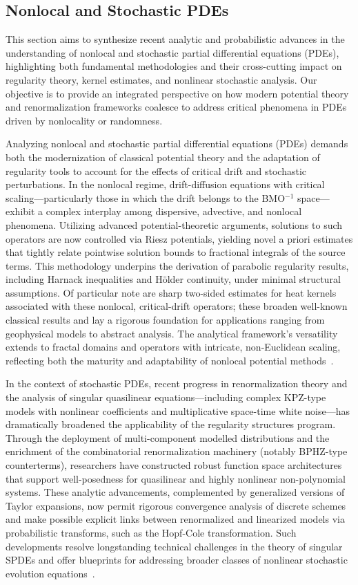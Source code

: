 \documentclass[sigconf]{acmart}
\begin{document}
\subsection{Nonlocal and Stochastic PDEs}

This section aims to synthesize recent analytic and probabilistic advances in the understanding of nonlocal and stochastic partial differential equations (PDEs), highlighting both fundamental methodologies and their cross-cutting impact on regularity theory, kernel estimates, and nonlinear stochastic analysis. Our objective is to provide an integrated perspective on how modern potential theory and renormalization frameworks coalesce to address critical phenomena in PDEs driven by nonlocality or randomness.

Analyzing nonlocal and stochastic partial differential equations (PDEs) demands both the modernization of classical potential theory and the adaptation of regularity tools to account for the effects of critical drift and stochastic perturbations. In the nonlocal regime, drift-diffusion equations with critical scaling—particularly those in which the drift belongs to the BMO$^{-1}$ space—exhibit a complex interplay among dispersive, advective, and nonlocal phenomena. Utilizing advanced potential-theoretic arguments, solutions to such operators are now controlled via Riesz potentials, yielding novel a priori estimates that tightly relate pointwise solution bounds to fractional integrals of the source terms. This methodology underpins the derivation of parabolic regularity results, including Harnack inequalities and Hölder continuity, under minimal structural assumptions. Of particular note are sharp two-sided estimates for heat kernels associated with these nonlocal, critical-drift operators; these broaden well-known classical results and lay a rigorous foundation for applications ranging from geophysical models to abstract analysis. The analytical framework's versatility extends to fractal domains and operators with intricate, non-Euclidean scaling, reflecting both the maturity and adaptability of nonlocal potential methods~\cite{ref95}.

In the context of stochastic PDEs, recent progress in renormalization theory and the analysis of singular quasilinear equations—including complex KPZ-type models with nonlinear coefficients and multiplicative space-time white noise—has dramatically broadened the applicability of the regularity structures program. Through the deployment of multi-component modelled distributions and the enrichment of the combinatorial renormalization machinery (notably BPHZ-type counterterms), researchers have constructed robust function space architectures that support well-posedness for quasilinear and highly nonlinear non-polynomial systems. These analytic advancements, complemented by generalized versions of Taylor expansions, now permit rigorous convergence analysis of discrete schemes and make possible explicit links between renormalized and linearized models via probabilistic transforms, such as the Hopf-Cole transformation. Such developments resolve longstanding technical challenges in the theory of singular SPDEs and offer blueprints for addressing broader classes of nonlinear stochastic evolution equations~\cite{ref94}.
\end{document}
